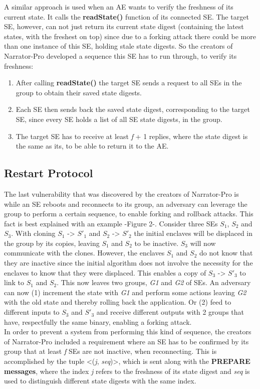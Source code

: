 A similar approach is used when an AE wants to verify the freshness of its current state. It calls the \textbf{readState()} function of its connected SE. The target SE, however, can not just return its current state digest (containing the latest states, with the freshest on top)
since due to a forking attack there could be more than one instance of this SE, holding stale state digests. So the creators of Narrator-Pro developed a sequence this SE has to run through, to verify its freshness:
\begin{enumerate}
    \item After calling \textbf{readState()} the target SE sends a request to all SEs in the group to obtain their saved state digests.
    \item Each SE then sends back the saved state digest, corresponding to the target SE, since every SE holds a list of all SE state digests, in the group.
    \item The target SE has to receive at least \textit{f} + 1 replies, where the state digest is the same as its, to be able to return it to the AE. 
\end{enumerate}


\subsection{Restart Protocol}
The last vulnerability that was discovered by the creators of Narrator-Pro is while an SE reboots and reconnects to its group, an adversary can leverage the group to perform a certain sequence, to enable forking and rollback attacks. This fact is best explained with an example -Figure 2-. Consider three SEs \(S_{1}\), \(S_{2}\) and \(S_{3}\). With cloning \(S_{1}\) -> \(S'_{1}\) and \(S_{2}\) -> \(S'_{2}\) the initial enclaves will be displaced in the group by its copies, leaving \(S_{1}\) and \(S_{2}\) to be inactive. \(S_{3}\) will now communicate with the clones. However, the enclaves \(S_{1}\) and \(S_{2}\) do not know that they are inactive since the initial algorithm does not involve the necessity for the enclaves to know that they were displaced. This enables a copy of \(S_{3}\) -> \(S'_{3}\) to link to \(S_{1}\) and \(S_{2}\). This now leaves two groups, \textit{G1} and \textit{G2} of SEs. An adversary can now (1) increment the state with \textit{G1} and perform some actions leaving \textit{G2} with the old state and thereby rolling back the application. Or (2) feed to different inputs to \(S_{3}\) and \(S'_{3}\) and receive different outputs with 2 groups that have, respectfully the same binary, enabling a forking attack.\\
In order to prevent a system from performing this kind of sequence, the creators of Narrator-Pro included a requirement where an SE has to be confirmed by its group that at least \textit{f} SEs are not inactive, when reconnecting. This is accomplished by the tuple <(\textit{j}, \textit{seq})>, which is sent along with the \textbf{PREPARE messages}, where the index \textit{j} refers to the freshness of its state digest and \textit{seq} is used to distinguish different state digests with the same index.\\
